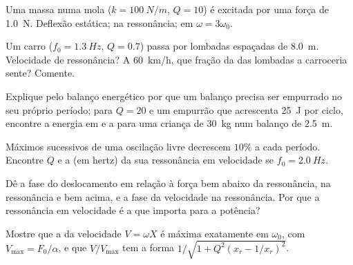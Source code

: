 \begin{exercise}[$\star$]\label{exo:b1:oscillators-resonance:4}
Uma massa numa mola ($k = \qty{100}{N/m}$, $Q = 10$) é excitada por uma força
de  \qty{1.0}{N}. Deflexão estática;  na ressonância;
 em $\omega = 3\omega_0$.
\end{exercise}

\begin{exercise}[$\star\star$]\label{exo:b1:oscillators-resonance:5}
Um carro ($f_0 = \qty{1.3}{Hz}$, $Q = 0.7$) passa por lombadas espaçadas de \qty{8.0}{m}.
Velocidade de ressonância? A \qty{60}{km/h}, que fração da  das
lombadas a carroceria sente? Comente.
\end{exercise}

\begin{exercise}[$\star\star$]\label{exo:b1:oscillators-resonance:6}
Explique pelo balanço energético por que um balanço precisa ser empurrado no seu próprio
período; para $Q = 20$ e um empurrão que acrescenta \qty{25}{J} por ciclo, encontre a
energia em  e a  para uma criança de \qty{30}{kg} num
balanço de \qty{2.5}{m}.
\end{exercise}

\begin{exercise}[$\star\star$]\label{exo:b1:oscillators-resonance:7}
Máximos sucessivos de uma oscilação livre decrescem $10\%$ a cada período.
Encontre $Q$ e a  (em hertz) da sua ressonância em velocidade se
$f_0 = \qty{2.0}{Hz}$.
\end{exercise}

\begin{exercise}[$\star\star$]\label{exo:b1:oscillators-resonance:8}
Dê a fase do deslocamento em relação à força bem abaixo da
ressonância, na ressonância e bem acima, e a fase da velocidade
na ressonância. Por que a ressonância em velocidade é a que importa para
a potência?
\end{exercise}

\begin{exercise}[$\star\star$]\label{exo:b1:oscillators-resonance:9}
Mostre que a  da velocidade $V = \omega X$ é máxima exatamente em
$\omega_0$, com $V_{\max} = F_0/\alpha$, e que $V/V_{\max}$ tem a
forma $1/\sqrt{1 + Q^2(x_r - 1/x_r)^2}$.
\end{exercise}

